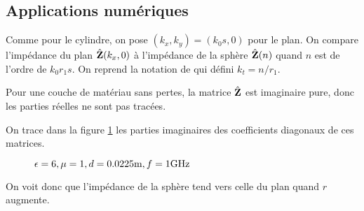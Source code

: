   \subsection{Applications numériques}
    Comme pour le cylindre, on pose \((k_x,k_y) = (k_0 s, 0)\) pour le plan. On compare l'impédance du plan \(\hat{\mathbf{Z}}(k_x,0)\) à l'impédance de la sphère \(\hat{\mathbf{Z}}(n)\) quand \(n\) est de l'ordre de \(k_0r_1s\). On reprend la notation de \cite[p.~62]{hoppe_impedance_1995} qui défini \(k_t= n/r_1\).

    Pour une couche de matériau sans pertes, la matrice \(\hat{\mathbf{Z}}\) est imaginaire pure, donc les parties réelles ne sont pas tracées.

    On trace dans la figure \ref{fig:imp_fourier:sphere:hoppe_p62:converge_rayon} les parties imaginaires des coefficients diagonaux de ces matrices.

    \begin{figure}[!hbt]
      \centering
      
      \caption{\(\epsilon = 6, \mu = 1, d=0.0225\text{m}, f=1\text{GHz}\)}
      \label{fig:imp_fourier:sphere:hoppe_p62:converge_rayon}
    \end{figure}
     On voit donc que l'impédance de la sphère tend vers celle du plan quand \(r\) augmente.
